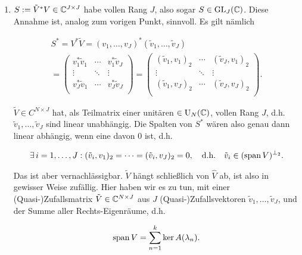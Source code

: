 \begin{enumerate}[label = \arabic*.]
    \item $S := \tilde V^\ast V \in \mathbb{C}^{J \times J}$ habe vollen Rang $J$, also sogar $S \in \operatorname{GL}_J(\mathbb{C})$.
    Diese Annahme ist, analog zum vorigen Punkt, sinnvoll.
    Es gilt nämlich

    \begin{multline*}
        S^\ast
        =
        V^\ast \tilde V
        =
        (v_1, \dots, v_J)^\ast (\tilde v_1, \dots, \tilde v_J) \\
        =
        \begin{pmatrix}
            v_1^\ast \tilde v_1 & \cdots & v_1^\ast \tilde v_J \\
            \vdots              & \ddots & \vdots              \\
            v_J^\ast \tilde v_1 & \cdots & v_J^\ast \tilde v_J \\
        \end{pmatrix}
        =
        \begin{pmatrix}
            (\tilde v_1, v_1)_2 & \cdots & (\tilde v_J, v_1)_2 \\
            \vdots              & \ddots & \vdots              \\
            (\tilde v_1, v_J)_2 & \cdots & (\tilde v_J, v_J)_2 \\
        \end{pmatrix}.
    \end{multline*}

    $\tilde V \in C^{N \times J}$ hat, als Teilmatrix einer unitären $\in \operatorname{U}_N(\mathbb{C})$, vollen Rang $J$, d.h. $\tilde v_1, \dots, \tilde v_J$ sind linear unabhängig.
    Die Spalten von $S^\ast$ wären also genau dann linear abhängig, wenn eine davon $0$ ist, d.h.

    \begin{align*}
        \exists \, i = 1, \dots, J:
            (\tilde v_i, v_1)_2 = \cdots = (\tilde v_i, v_J)_2 = 0,
            \quad
            \text{d.h.}
            \quad
            \tilde v_i \in (\operatorname{span} V)^{\bot_2}.
    \end{align*}

    Das ist aber vernachlässigbar.
    $\tilde V$ hängt schließlich von $\hat V$ ab, ist also in gewisser Weise zufällig.
    Hier haben wir es zu tun, mit einer (Quasi-)Zufallsmatrix $\tilde V \in \mathbb{C}^{N \times J}$ aus $J$ (Quasi-)Zufallsvektoren $\tilde v_1, \dots, \tilde v_J$, und der Summe aller Rechts-Eigenräume, d.h.

    \begin{align*}
        \operatorname{span} V
        =
        \sum_{n=1}^k
            \ker A(\lambda_n).
    \end{align*}

\end{enumerate}
